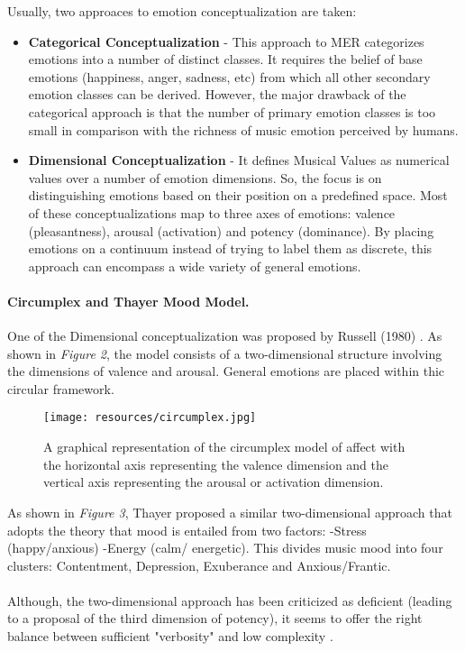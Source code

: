 Usually, two approaces to emotion conceptualization are taken: 

\begin{itemize}
    \item \textbf{Categorical Conceptualization} - This approach to MER categorizes emotions into a number of distinct classes. 
        It requires the belief of base emotions (happiness, anger, sadness, etc) from which all other secondary emotion classes can be derived.\cite{Ekman1992}
        However, the major drawback of the categorical approach is that the number of primary emotion classes is too small in comparison with the richness of music emotion perceived by humans.

    \item \textbf{Dimensional Conceptualization} - It defines Musical Values as numerical values over a number of emotion dimensions. 
        So, the focus is on distinguishing emotions based on their position on a predefined space.
        Most of these conceptualizations map to three axes of emotions: valence (pleasantness), arousal (activation) and potency (dominance).
        By placing emotions on a continuum instead of trying to label them as discrete, this approach can encompass a wide variety of general emotions.

\end{itemize}

\paragraph{Circumplex and Thayer Mood Model.}

One of the Dimensional conceptualization was proposed by Russell (1980) \cite{Russell1980}.
As shown in \textit{Figure 2}, the model consists of a two-dimensional structure involving the dimensions of valence and arousal. 
General emotions are placed within thic circular framework.

\begin{figure}[hlvt!]
        \centering
        \texttt{[image: resources/circumplex.jpg]}
        \caption{A graphical representation of the circumplex model of affect with the horizontal axis representing the valence dimension and the vertical axis representing the arousal or activation dimension.}
        \label{fig:figure2}
\end{figure}

As shown in \textit{Figure 3}, Thayer \cite{Thayer1990} proposed a similar two-dimensional approach that adopts the theory that mood is entailed from two factors: -Stress (happy/anxious) -Energy (calm/ energetic). 
This divides music mood into four clusters: Contentment, Depression, Exuberance and Anxious/Frantic.\\
\\
Although, the two-dimensional approach has been criticized as deficient (leading to a proposal of the third dimension of potency), it seems to offer the right balance between sufficient "verbosity" and low complexity \cite{Juslin2001}.

